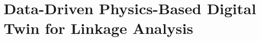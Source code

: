 

% 



% 
\graphicspath{{sections/04_DOJO-CCK_Simulation/}}


\chapter{Data-Driven Physics-Based Digital Twin for Linkage Analysis}\label{sec:dojockc}



